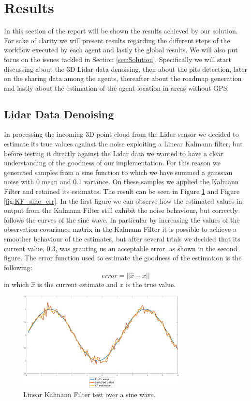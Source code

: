 \documentclass[twocolumn, a4paper]{article}
\begin{document}
\section{Results}
In this section of the report will be shown the results achieved by our
solution. For sake of clarity we will present results regarding the different
steps of the workflow executed by each agent and lastly the global results.
We will also put focus on the issues tackled in Section \ref{sec:Solution}.
Specifically we will start discussing about the 3D Lidar data denoising, then
about the pits detection, later on the sharing data among the agents,
thereafter about the roadmap generation and lastly about the estimation
of the agent location in areas without GPS.
\subsection{Lidar Data Denoising}
In processing the incoming 3D point cloud from the Lidar sensor we decided
to estimate its true values against the noise exploiting a Linear Kalmann
filter, but before testing it directly against the Lidar data we wanted to
have a clear understanding of the goodness of our implementation. For this
reason we generated samples from a sine function to which we have summed
a gaussian noise with 0 mean and 0.1 variance. On these samples we applied
the Kalmann Filter and retained its estimates. The result can be seen in
Figure \ref{fig:KF_sine} and Figure \ref{fig:KF_sine_err}. In the first
figure we can observe how the estimated values in output from the Kalmann
Filter still exhibit the noise behaviour, but correctly follows the
curves of the sine wave. In particular by increasing the values of the 
observation covariance matrix in the Kalmann Filter it
is possible to achieve a 
smoother behaviour of the estimates, but after several trials we decided
that its current value, 0.3, was granting us an acceptable error, as shown
in the second figure. The error function used to estimate the goodness
of the estimation is the following:
\begin{equation}
    error = ||\hat{x} - x||
\end{equation}
in which $\hat{x}$ is the current estimate and $x$ is the true value.
\vspace{0.5cm}
\begin{figure}[h]
    \centering
    \includegraphics[width=8.5cm]{"../Report_images/Denoising_KF_sine"}
    \caption{Linear Kalmann Filter test over a sine wave.}
    \label{fig:KF_sine}
\end{figure}
\end{document}
